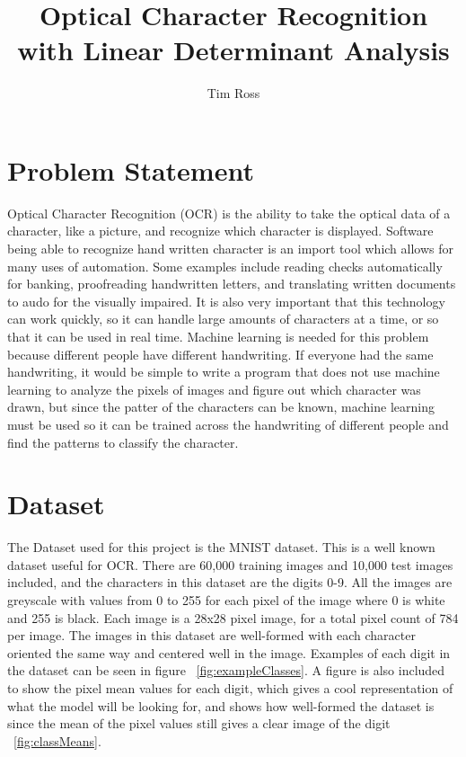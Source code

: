 \documentclass[12pt, twocolumn]{article}
\title{Optical Character Recognition with Linear Determinant Analysis}
\author{Tim Ross}
\begin{document}
  \maketitle

\section{Problem Statement}
Optical Character Recognition (OCR) is the ability to take the optical data of a character, like a picture, and recognize which character is displayed. Software being able to recognize hand written character is an import tool which allows for many uses of automation. Some examples include reading checks automatically for banking, proofreading handwritten letters, and translating written documents to audo for the visually impaired. It is also very important that this technology can work quickly, so it can handle large amounts of characters at a time, or so that it can be used in real time. Machine learning is needed for this problem because different people have different handwriting. If everyone had the same handwriting, it would be simple to write a program that does not use machine learning to analyze the pixels of images and figure out which character was drawn, but since the patter of the characters can be known, machine learning must be used so it can be trained across the handwriting of different people and find the patterns to classify the character.


\section{ Dataset}
The Dataset used for this project is the MNIST dataset. This is a well known dataset useful for OCR. There are 60,000 training images and 10,000 test images included, and the characters in this dataset are the digits 0-9. All the images are greyscale with values from 0 to 255 for each pixel of the image where 0 is white and 255 is black. Each image is a 28x28 pixel image, for a total pixel count of 784 per image. The images in this dataset are well-formed with each character oriented the same way and centered well in the image. Examples of each digit in the dataset can be seen in figure ~\ref{fig:exampleClasses}. A figure is also included to show the pixel mean values for each digit, which gives a cool representation of what the model will be looking for, and shows how well-formed the dataset is since the mean of the pixel values still gives a clear image of the digit ~\ref{fig:classMeans}.
\end{document}
